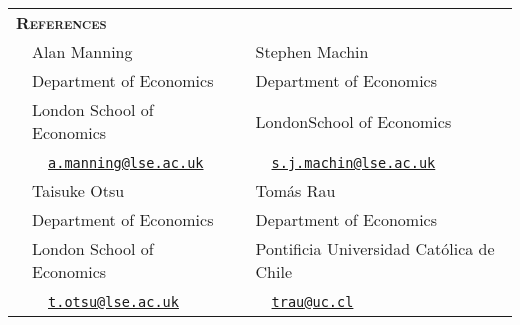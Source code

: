 \begin{tabular}{llll}

	\multicolumn{3}{l}{
		\large
		\textbf{%
			\textsc{%
				References
			}
		}
	}
	\\[2ex]
		
	\indent
	& Alan Manning
	& \hspace{4.5em}
	& Stephen Machin
	\\[.25ex]
	
	& Department of Economics
	&
	& Department of Economics
	\\[.25ex]
	
	& London School of Economics
	&
	& LondonSchool of Economics
	\\[.25ex]
	
	& \textcolor{stlavender}{\faEnvelopeO}~~\href{mailto:a.manning@lse.ac.uk}{\texttt{a.manning@lse.ac.uk}}
	&
	& \textcolor{stlavender}{\faEnvelopeO}~~\href{mailto:s.j.machin@lse.ac.uk}{\texttt{s.j.machin@lse.ac.uk}}
	\\[1.5em]
	
	& Taisuke Otsu
	&
	& Tom\'as Rau
	\\[.25ex]
	
	& Department of Economics
	&
	& Department of Economics
	\\[.25ex]
	
	& London School of Economics
	&
	& Pontificia Universidad Cat\'olica de Chile
	\\[.25ex]
	
	& \textcolor{stlavender}{\faEnvelopeO}~~\href{mailto:t.otsu@lse.ac.uk}{\texttt{t.otsu@lse.ac.uk}}
	&
	& \textcolor{stlavender}{\faEnvelopeO}~~\href{mailto:trau@uc.cl}{\texttt{trau@uc.cl}}
	
\end{tabular}